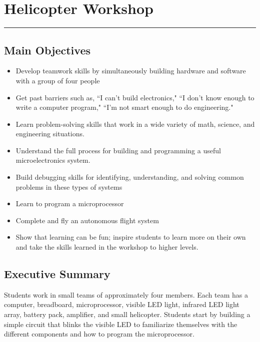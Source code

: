 \documentclass[11pt]{article}
\begin{document}

\section*{Helicopter Workshop}
\hrule

\vspace{20pt}

\subsection*{Main Objectives}

\begin{itemize}
    \item Develop teamwork skills by simultaneously building hardware and software with a group of four people
    \item Get past barriers such as, ``I can’t build electronics," ``I don’t know enough to write a computer program," ``I'm not smart enough to do engineering."
    \item Learn problem-solving skills that work in a wide variety of math, science, and engineering situations.
    \item Understand the full process for building and programming a useful microelectronics system.
    \item Build debugging skills for identifying, understanding, and solving common problems in these types of systems
    \item Learn to program a microprocessor
    \item Complete and fly an autonomous flight system
    \item Show that learning can be fun; inspire students to learn more on their own and take the skills learned in the workshop to higher levels.
\end{itemize}

\subsection*{Executive Summary}
Students work in small teams of approximately four members.  Each team has a computer, breadboard, microprocessor, visible LED light, infrared LED light array, battery pack, amplifier, and small helicopter.  Students start by building a simple circuit that blinks the visible LED to familiarize themselves with the different components and how to program the microprocessor.
\end{document}
